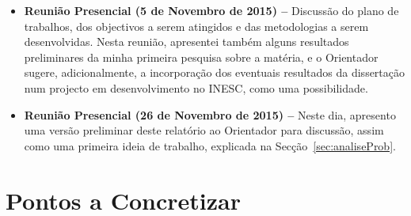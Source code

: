 \documentclass[a4paper, onecolumn, 10pt]{article}
\begin{document}
\begin{itemize}
		\item
			\textbf{Reunião Presencial (5 de Novembro de 2015) --} Discussão do plano de trabalhos, dos objectivos a serem atingidos e das metodologias a serem desenvolvidas. Nesta reunião, apresentei também alguns resultados preliminares da minha primeira pesquisa sobre a matéria, e o Orientador sugere, adicionalmente, a incorporação dos eventuais resultados da dissertação num projecto em desenvolvimento no INESC, como uma possibilidade.

		\item
			\textbf{Reunião Presencial (26 de Novembro de 2015) --} Neste dia, apresento uma versão preliminar deste relatório ao Orientador para discussão, assim como uma primeira ideia de trabalho, explicada na Secção~\ref{sec:analiseProb}.
	\end{itemize}

	\section{Pontos a Concretizar}

	\printbibliography
\end{document}
